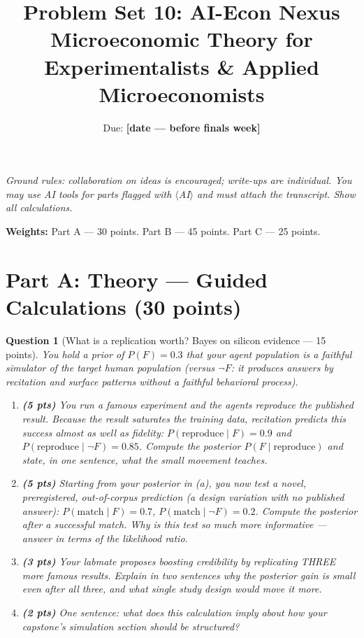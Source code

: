 \documentclass[11pt]{article}
\title{Problem Set 10: AI-Econ Nexus\\
\large Microeconomic Theory for Experimentalists \& Applied Microeconomists}
\author{Due: \textbf{[date --- before finals week]}}
\date{}
\newtheorem{question}{Question}
\begin{document}
\maketitle

\noindent\emph{Ground rules: collaboration on ideas is encouraged; write-ups
are individual. You may use AI tools for parts flagged with
$\langle$AI$\rangle$ and must attach the transcript. Show all calculations.}

\medskip

\noindent\textbf{Weights:} Part A --- 30 points. Part B --- 45 points.
Part C --- 25 points.

\bigskip

\section*{Part A: Theory --- Guided Calculations (30 points)}

\begin{question}[What is a replication worth? Bayes on silicon evidence
--- 15 points]
You hold a prior of $P(F) = 0.3$ that your agent population is a
\emph{faithful simulator} of the target human population (versus
$\neg F$: it produces answers by recitation and surface patterns
without a faithful behavioral process).

\begin{enumerate}[label=(\alph*)]
  \item \textbf{(5 pts)} You run a famous experiment and the agents
        reproduce the published result. Because the result saturates
        the training data, recitation predicts this success almost as
        well as fidelity: $P(\text{reproduce} \mid F) = 0.9$ and
        $P(\text{reproduce} \mid \neg F) = 0.85$. Compute the
        posterior $P(F \mid \text{reproduce})$ and state, in one
        sentence, what the small movement teaches.
  \item \textbf{(5 pts)} Starting from your posterior in (a), you now
        test a \emph{novel, preregistered, out-of-corpus} prediction
        (a design variation with no published answer):
        $P(\text{match} \mid F) = 0.7$,
        $P(\text{match} \mid \neg F) = 0.2$. Compute the posterior
        after a successful match. Why is this test so much more
        informative --- answer in terms of the likelihood ratio.
  \item \textbf{(3 pts)} Your labmate proposes boosting credibility by
        replicating THREE more famous results. Explain in two
        sentences why the posterior gain is small even after all
        three, and what single study design would move it more.
  \item \textbf{(2 pts)} One sentence: what does this calculation
        imply about how your capstone's simulation section should be
        structured?
\end{enumerate}
\end{question}
\end{document}
